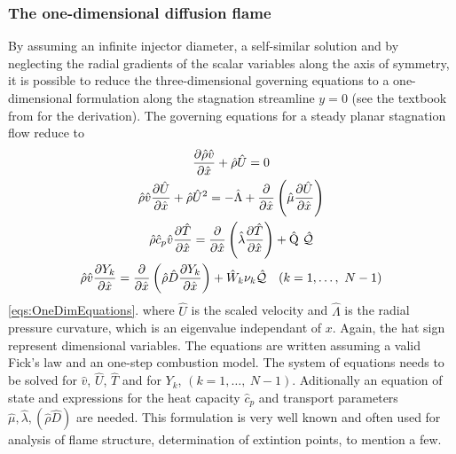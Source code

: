 \subsubsection{The one-dimensional diffusion flame}
By assuming an infinite injector diameter, a self-similar solution and by neglecting the radial gradients of the scalar variables along the axis of symmetry, it is possible to reduce the three-dimensional governing equations to a one-dimensional formulation along the stagnation streamline $y = 0$ (see the textbook from \cite{keeChemicallyReactingFlow2003} for the derivation).  The governing equations for a steady planar stagnation flow reduce to
\begin{subequations}
\begin{gather}
	\frac{\partial\hat\rho \hat v}{\partial \hat x} +  \hat \rho \hat U = 0\label{eq:OneDimCont}\\ %
	\hat \rho \hat v \frac{\partial \hat U}{\partial \hat x} + \hat \rho \hat U^2 =
	- \hat \Lambda
	+ \frac{\partial}{\partial \hat x}\left(\hat \mu \frac{\partial \hat U}{\partial \hat x}\right)\label{eq:OneDimMom}\\ %
	\hat\rho \hat c_p \hat v \frac{\partial \hat T}{\partial\hat x} =
	\frac{\partial}{\partial \hat x}\left( \hat \lambda \frac{\partial \hat T}{\partial \hat x}\right)
	+\hat\heatRelease~\hat{\mathcal{Q}}\label{eq:OneDimTemp}\\
	\hat\rho \hat v \frac{\partial Y_k}{\partial \hat x} = 
	\frac{\partial}{\partial \hat x}\left(\hat \rho \hat D \frac{\partial Y_k}{\partial \hat x}\right)
	+ \hat W_k \stoicCoef_k \hat{\mathcal{Q}} \quad (k = 1, \dots,~N - 1) \label{eq:OneDimMF}
\end{gather}\label{eqs:OneDimEquations}%
\end{subequations}
\cref{eqs:OneDimEquations}.
where $\hat U$ is the scaled velocity and $\hat \Lambda$ is the radial pressure curvature, which is an eigenvalue independant of $x$. Again, the hat sign represent dimensional variables. The equations are written assuming a valid Fick's law and an one-step combustion model. The system of equations needs to be solved for $\hat v$, $\hat U$, $\hat T$ and for $Y_k$, $ (k = 1, \dots,~N - 1)$.  Aditionally an equation of state and expressions for the heat capacity $\hat c_p$ and transport parameters $\hat \mu, \hat \lambda, (\hat \rho \hat D)$ are needed. This formulation is very well known and often used for analysis of flame structure, determination of extintion points, to mention a few.

